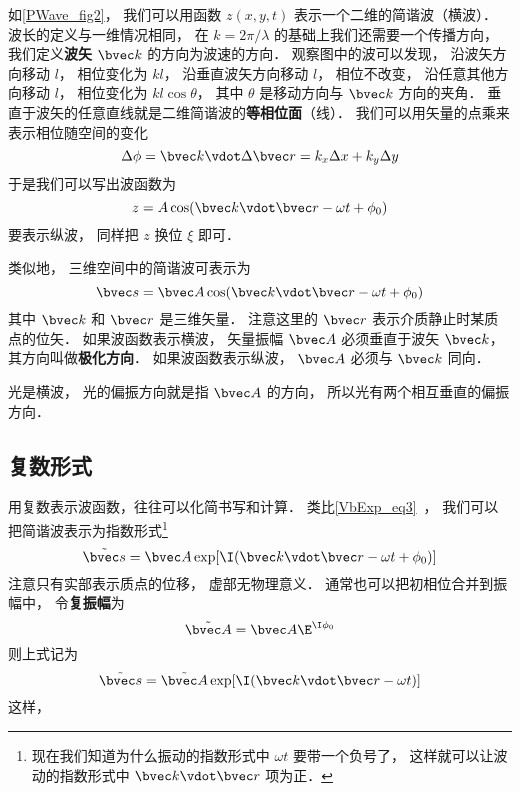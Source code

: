 如\autoref{PWave_fig2}， 我们可以用函数 $z(x,y,t)$ 表示一个二维的简谐波（横波）． 波长的定义与一维情况相同， 在 $k = 2\pi/\lambda$ 的基础上我们还需要一个传播方向， 我们定义\textbf{波矢} $\bvec k$ 的方向为波速的方向．
观察图中的波可以发现， 沿波矢方向移动 $l$， 相位变化为 $kl$， 沿垂直波矢方向移动 $l$， 相位不改变， 沿任意其他方向移动 $l$， 相位变化为 $kl\cos\theta$， 其中 $\theta$ 是移动方向与 $\bvec k$ 方向的夹角． 垂直于波矢的任意直线就是二维简谐波的\textbf{等相位面}（线）． 我们可以用矢量的点乘来表示相位随空间的变化
\begin{equation}
\Delta\phi = \bvec k \vdot \Delta\bvec r = k_x \Delta x + k_y \Delta y
\end{equation}
于是我们可以写出波函数为
\begin{equation}\label{PWave_eq8}
z = A \cos(\bvec k \vdot \bvec r - \omega t + \phi_0)
\end{equation}
要表示纵波， 同样把 $z$ 换位 $\xi$ 即可．

类似地， 三维空间中的简谐波可表示为
\begin{equation}
\bvec s = \bvec A \cos(\bvec k \vdot \bvec r - \omega t + \phi_0)
\end{equation}
其中 $\bvec k$ 和 $\bvec r$ 是三维矢量． 注意这里的 $\bvec r$ 表示介质静止时某质点的位矢． 如果波函数表示横波， 矢量振幅 $\bvec A$ 必须垂直于波矢 $\bvec k$， 其方向叫做\textbf{极化方向}． 如果波函数表示纵波， $\bvec A$ 必须与 $\bvec k$ 同向．

光是横波， 光的偏振方向就是指 $\bvec A$ 的方向， 所以光有两个相互垂直的偏振方向．

\subsection{复数形式}

用复数表示波函数，往往可以化简书写和计算． 类比\autoref{VbExp_eq3}~， 我们可以把简谐波表示为指数形式\footnote{现在我们知道为什么振动的指数形式中 $\omega t$ 要带一个负号了， 这样就可以让波动的指数形式中 $\bvec k\vdot \bvec r$ 项为正．}
\begin{equation}
\tilde {\bvec s} = \bvec A \exp[\I( \bvec k \vdot \bvec r - \omega t + \phi_0)]
\end{equation}
注意只有实部表示质点的位移， 虚部无物理意义． 通常也可以把初相位合并到振幅中， 令\textbf{复振幅}为
\begin{equation}
\tilde {\bvec A} = \bvec A \E^{\I \phi_0}
\end{equation}
则上式记为
\begin{equation}
\tilde {\bvec s} = \tilde {\bvec A} \exp[\I( \bvec k \vdot \bvec r - \omega t)]
\end{equation}
这样， 

